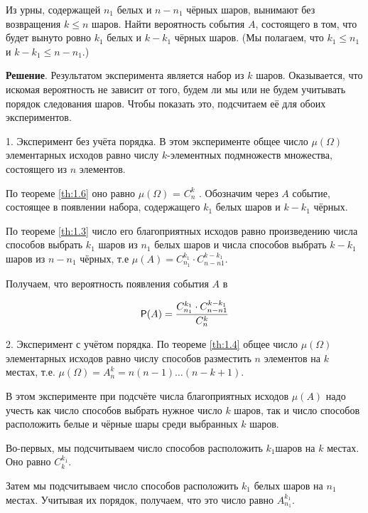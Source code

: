 \begin{num}
\label{num:10.1}
Из урны, содержащей $n_1$ белых и $n - n_1$ чёрных шаров,
вынимают без возвращения $k \leq n$ шаров. Найти вероятность события $A$, состоящего в том, что будет вынуто ровно $k_1$ белых и $k-k_1$ чёрных шаров.
(Мы полагаем, что $k_1 \leq n_1$ и $k - k_1 \leq n - n_1$.)
\end{num}

\textbf{Решение}. Результатом эксперимента является набор из $k$ шаров. Оказывается, что искомая вероятность не зависит от того, будем ли мы или не будем учитывать порядок следования шаров. Чтобы показать это, подсчитаем её для обоих экспериментов.

1. Эксперимент без учёта порядка. В этом эксперименте общее число $\mu(\Omega)$ элементарных исходов равно числу $k$-элементных подмножеств множества, состоящего из $n$ элементов.

По теореме \ref{th:1.6} оно равно $\mu(\Omega)$ = $C_n^k$ .
Обозначим через $A$ событие, состоящее в появлении набора, содержащего $k_1$ белых шаров и $k - k_1$ чёрных. 

По теореме \ref{th:1.3} число его благоприятных исходов равно произведению числа способов выбрать $k_1$ шаров из $n_1$ белых шаров и числа способов выбрать $k - k_1$ шаров из $n - n_1$ чёрных, т.е $\mu(A) = C_{n_1}^{k_1}\cdot C_{n-n1}^{k-k_1}$.

Получаем, что вероятность появления события $A$ в

\begin{equation*}
	\P(A)=\frac{C_{n_1}^{k_1}\cdot C_{n-n1}^{k-k_1}}{C_n^k}
\end{equation*}

2. Эксперимент с учётом порядка. По теореме \ref{th:1.4} общее число $\mu(\Omega)$ элементарных исходов равно числу способов разместить $n$ элементов на $k$
местах, т.е. $\mu(\Omega) = A_n^k = n(n - 1)\ldots(n - k + 1)$.

В этом эксперименте при подсчёте числа благоприятных исходов $\mu(A)$ надо учесть как число способов выбрать нужное число $k$ шаров, так и число способов расположить белые и чёрные шары среди выбранных $k$ шаров.

Во-первых, мы подсчитываем число способов расположить $k_1$шаров на $k$
местах. Оно равно $C_k^{k_1}$. 

Затем мы подсчитываем число способов расположить $k_1$ белых шаров на $n_1$ местах. Учитывая их порядок, получаем, что
это число равно $A_{n_1}^{k_1}$. 

